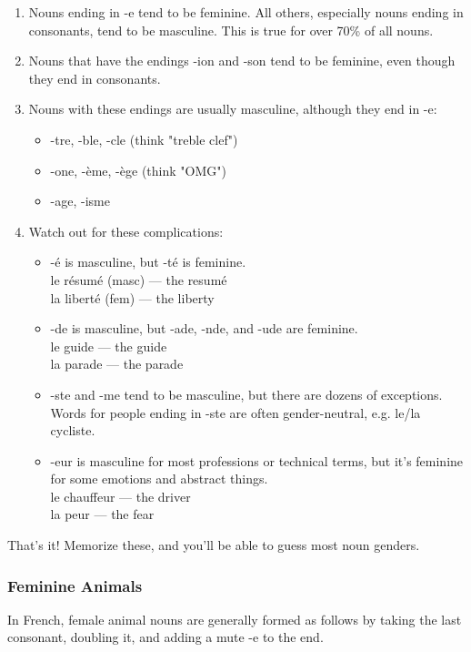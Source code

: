 \begin{enumerate}
  \item  Nouns ending in -e tend to be feminine. All others, especially nouns ending in consonants, tend to be masculine. This is true for over 70\% of all nouns.
  \item  Nouns that have the endings -ion and -son tend to be feminine, even though they end in consonants.
  \item  Nouns with these endings are usually masculine, although they end in -e:
    \begin{itemize}
      \item  -tre, -ble, -cle (think "treble clef")
      \item  -one, -ème, -ège (think "OMG")
      \item  -age, -isme
    \end{itemize}
  \item  Watch out for these complications:
    \begin{itemize}
      \item  -é is masculine, but -té is feminine. \\ le résumé (masc) — the resumé \\ la liberté (fem) — the liberty
      \item  -de is masculine, but -ade, -nde, and -ude are feminine. \\ le guide — the guide \\ la parade — the parade
      \item  -ste and -me tend to be masculine, but there are dozens of exceptions. Words for people ending in -ste are often gender-neutral, e.g. le/la cycliste.
      \item  -eur is masculine for most professions or technical terms, but it's feminine for some emotions and abstract things. \\ le chauffeur — the driver \\ la peur — the fear
    \end{itemize}
\end{enumerate}

That's it! Memorize these, and you'll be able to guess most noun genders.

\subsubsection{Feminine Animals}

In French, female animal nouns are generally formed as follows by taking the last consonant, doubling it, and adding a mute -e to the end.

